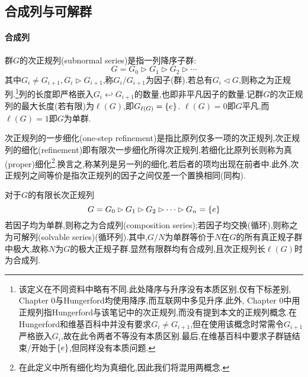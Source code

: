 \documentclass[11pt]{article} %
\begin{document}
\subsection{合成列与可解群}
\paragraph{合成列}
群$G$的次正规列(subnormal series)是指一列降序子群:
$$G=G_0\rhd G_1 \rhd G_2 \rhd \cdots$$
其中$G_i\neq G_{i+1}, G_i\rhd G_{i+1}$,称$G_i/G_{i+1}$为因子(群).若总有$G_i\lhd G$,则称之为正规列.\footnote{该定义在不同资料中略有不同.此处降序与升序没有本质区别,仅有下标差别, Chapter 0与Hungerford均使用降序,而互联网中多见升序.此外, Chapter 0中用正规列指Hungerford与该笔记中的次正规列,而没有提到本文的正规列概念.在Hungerford和维基百科中并没有要求$G_i\neq G_{i+1}$,但在使用该概念时常需令$G_{i+1}$严格嵌入$G_i$,故在此令两者不等没有本质区别.最后,在维基百科中要求子群链结束/开始于$\left\{e\right\}$,但同样没有本质问题.}列的长度即严格嵌入$G_i\hookleftarrow G_{i+1}$的数量,也即非平凡因子的数量.记群$G$的次正规列的最大长度(若有限)为$\ell(G)$,即$G_{\ell(G)}=\left\{e\right\}$. $\ell(G)=0$即$G$平凡,而$\ell(G)=1$即$G$为单群.

次正规列的一步细化(one-step refinement)是指比原列仅多一项的次正规列,次正规列的细化(refinement)即有限次一步细化所得次正规列,若细化比原列长则称为真(proper)细化\footnote{在此定义中所有细化均为真细化,因此我们将混用两概念.}.换言之,称某列是另一列的细化,若后者的项均出现在前者中.此外,次正规列之间等价是指次正规列的因子之间仅差一个置换相同(同构).

对于$G$的有限长次正规列
$$G=G_0\rhd G_1 \rhd G_2 \rhd \cdots \rhd G_n=\left\{e\right\}$$
若因子均为单群,则称之为合成列(composition series);若因子均交换(循环),则称之为可解列(solvable series)(循环列).其中,$G/N$为单群等价于$N$在$G$的所有真正规子群中极大,故称$N$为$G$的极大正规子群.显然有限群均有合成列,且次正规列长$\ell(G)$时为合成列.
\end{document}

